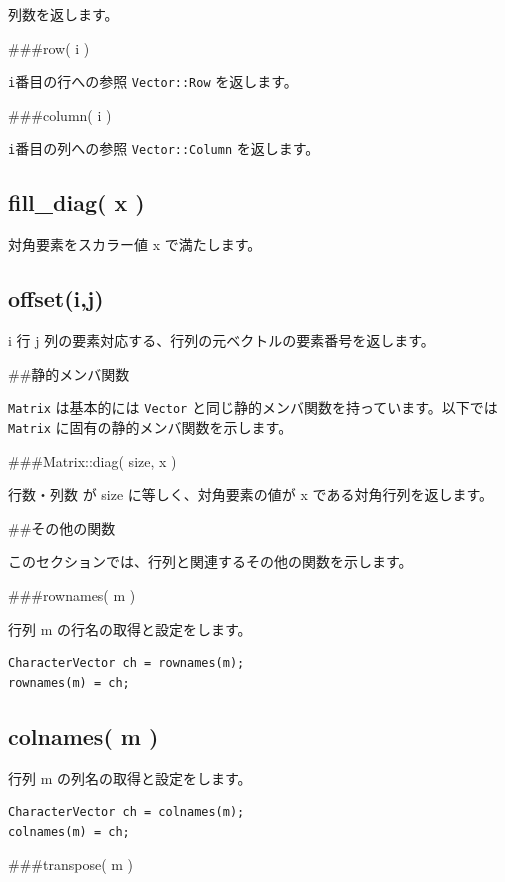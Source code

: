 \documentclass[]{book}
\begin{document}
列数を返します。

\#\#\#row( i )

\texttt{i}番目の行への参照 \texttt{Vector::Row} を返します。

\#\#\#column( i )

\texttt{i}番目の列への参照 \texttt{Vector::Column} を返します。

\hypertarget{fill_diag-x}{%
\subsection{fill\_diag( x )}\label{fill_diag-x}}

対角要素をスカラー値 x で満たします。

\hypertarget{offsetij}{%
\subsection{offset(i,j)}\label{offsetij}}

i 行 j 列の要素対応する、行列の元ベクトルの要素番号を返します。

\#\#静的メンバ関数

\texttt{Matrix} は基本的には \texttt{Vector} と同じ静的メンバ関数を持っています。以下では \texttt{Matrix} に固有の静的メンバ関数を示します。

\#\#\#Matrix::diag( size, x )

行数・列数 が size に等しく、対角要素の値が x である対角行列を返します。

\#\#その他の関数

このセクションでは、行列と関連するその他の関数を示します。

\#\#\#rownames( m )

行列 m の行名の取得と設定をします。

\begin{verbatim}
CharacterVector ch = rownames(m);
rownames(m) = ch;
\end{verbatim}

\hypertarget{colnames-m}{%
\subsection{colnames( m )}\label{colnames-m}}

行列 m の列名の取得と設定をします。

\begin{verbatim}
CharacterVector ch = colnames(m);
colnames(m) = ch;
\end{verbatim}

\#\#\#transpose( m )
\end{document}
